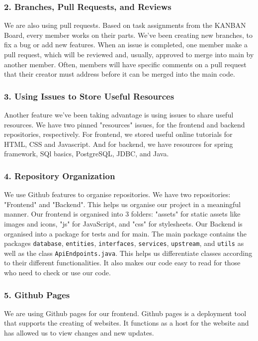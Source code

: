\documentclass[fontsize=14pt]{article}
\def\code#1{\texttt{#1}}
\begin{document}
\subsubsection*{2. Branches, Pull Requests, and Reviews}

We are also using pull requests. Based on task assignments from the KANBAN Board, every member works on their parts. We've been creating new branches, to fix a bug or add new features. When an issue is completed, one member make a pull request, which will be reviewed and, usually, approved to merge into main by another member. Often, members will have specific comments on a pull request that their creator must address before it can be merged into the main code.

\subsubsection*{3. Using Issues to Store Useful Resources}

Another feature we've been taking advantage is using issues to share useful resources. We have two pinned "resources" issues, for the frontend and backend repositories, respectively. For frontend, we stored useful online tutorials for HTML, CSS and Javascript. And for backend, we have resources for spring framework, SQl basics, PostgreSQL, JDBC, and Java.

\subsubsection*{4. Repository Organization}

We use Github features to organise repositories. We have two repositories: "Frontend" and "Backend". This helps us organise our project in a meaningful manner.
Our frontend is organised into 3 folders: "assets" for static assets like images and icons, "js" for JavaScript, and "css" for stylesheets.
Our Backend is organised into a package for tests and for main. The main package contains the packages \code{database}, \code{entities}, \code{interfaces}, \code{services}, \code{upstream}, and \code{utils} as well as the class \code{ApiEndpoints.java}. This helps us differentiate classes according to their different functionalities. It also makes our code easy to read for those who need to check or use our code. 

\subsubsection*{5. Github Pages}
We are using Github pages for our frontend. Github pages is a deployment tool that supports the creating of websites. It functions as a host for the website and has allowed us to view changes and new updates.
\end{document}
